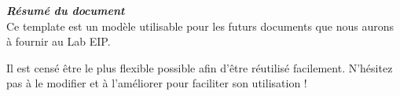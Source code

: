 \thispagestyle{empty}
\vspace*{10mm}

\textbf{\emph{\textcolor{epiBlue}{Résumé du document} } }\\

Ce template est un modèle utilisable pour les futurs documents que nous aurons à fournir au Lab EIP.

Il est censé être le plus flexible possible afin d'être réutilisé facilement.
N'hésitez pas à le modifier et à l'améliorer pour faciliter son utilisation !
\newpage
